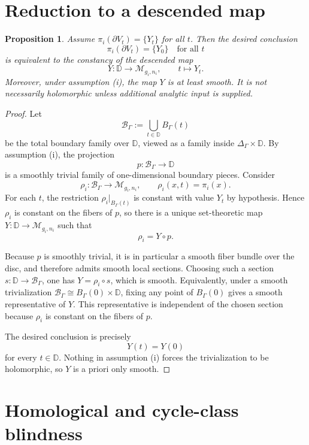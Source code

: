 \documentclass[12pt]{article}
\theoremstyle{plain}
\newtheorem{proposition}[theorem]{Proposition}
\theoremstyle{definition}
\theoremstyle{remark}
\newcommand{\D}{\mathbb D}
\newcommand{\M}{\mathcal M}
\begin{document}
\section{Reduction to a descended map}\label{sec:reduction}

\begin{proposition}\label{prop:reduction}
Assume \(\pi_i(\partial V_t)=\{Y_t\}\) for all \(t\).  Then the desired conclusion
\[
\pi_i(\partial V_t)=\{Y_0\}\quad\text{for all }t
\]
is equivalent to the constancy of the descended map
\[
Y:\D\longrightarrow \M_{g_i,n_i},\qquad t\longmapsto Y_t.
\]
Moreover, under assumption (i), the map \(Y\) is at least smooth.  It is not necessarily holomorphic unless additional analytic input is supplied.
\end{proposition}

\begin{proof}
Let
\[
\mathcal B_\Gamma:=\bigcup_{t\in\D} B_\Gamma(t)
\]
be the total boundary family over \(\D\), viewed as a family inside \(\Delta_\Gamma\times \D\).  By assumption (i), the projection
\[
p:\mathcal B_\Gamma\to \D
\]
is a smoothly trivial family of one-dimensional boundary pieces.  Consider
\[
\rho_i:\mathcal B_\Gamma\to \M_{g_i,n_i},\qquad \rho_i(x,t)=\pi_i(x).
\]
For each \(t\), the restriction \(\rho_i|_{B_\Gamma(t)}\) is constant with value \(Y_t\) by hypothesis.  Hence \(\rho_i\) is constant on the fibers of \(p\), so there is a unique set-theoretic map \(Y:\D\to \M_{g_i,n_i}\) such that
\[
\rho_i=Y\circ p.
\]

Because \(p\) is smoothly trivial, it is in particular a smooth fiber bundle over the disc, and therefore admits smooth local sections.  Choosing such a section \(s:\D\to \mathcal B_\Gamma\), one has \(Y=\rho_i\circ s\), which is smooth.  Equivalently, under a smooth trivialization \(\mathcal B_\Gamma\cong B_\Gamma(0)\times \D\), fixing any point of \(B_\Gamma(0)\) gives a smooth representative of \(Y\).  This representative is independent of the chosen section because \(\rho_i\) is constant on the fibers of \(p\).

The desired conclusion is precisely
\[
Y(t)=Y(0)
\]
for every \(t\in\D\).  Nothing in assumption (i) forces the trivialization to be holomorphic, so \(Y\) is a priori only smooth.
\end{proof}

\section{Homological and cycle-class blindness}
\end{document}
